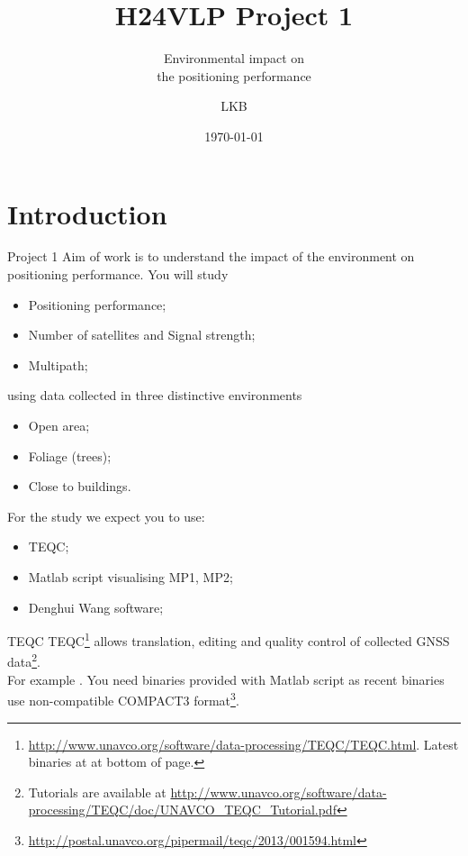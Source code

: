 \documentclass[11pt]{beamer}
\title[H24VLP]{H24VLP Project 1}
\subtitle{Environmental impact on \\the positioning performance}
\author{LKB}
\institute{NGI}
\date{\today}
\begin{document}
	
	\begin{frame}
		\titlepage
	\end{frame}
	
	
\section{Introduction}

	\begin{frame}[allowframebreaks]{Project 1}
		Aim of work is to understand the impact of the environment on positioning performance. You will study 
		\begin{itemize}
			\item Positioning performance;
			\item Number of satellites and Signal strength;
			\item Multipath;
		\end{itemize}
		using data collected in three distinctive environments
		\begin{itemize}
			\item Open area;
			\item Foliage (trees);
			\item Close to buildings.
		\end{itemize}
		For the study we expect you to use:
		\begin{itemize}
			\item TEQC;
			\item Matlab script visualising MP1, MP2;
			\item Denghui Wang software;
		\end{itemize}

	\end{frame}


	\begin{frame}{TEQC}
		TEQC\footnote{\url{http://www.unavco.org/software/data-processing/TEQC/TEQC.html}. Latest binaries at at bottom of page.} allows translation, editing and quality control of collected GNSS data\footnote{Tutorials are available at \url{http://www.unavco.org/software/data-processing/TEQC/doc/UNAVCO_TEQC_Tutorial.pdf}}. \\
		\medskip
		For example . You need binaries provided with Matlab script as recent binaries use non-compatible COMPACT3 format\footnote{\url{http://postal.unavco.org/pipermail/teqc/2013/001594.html}}.




		
	\end{frame}
	
\end{document}
